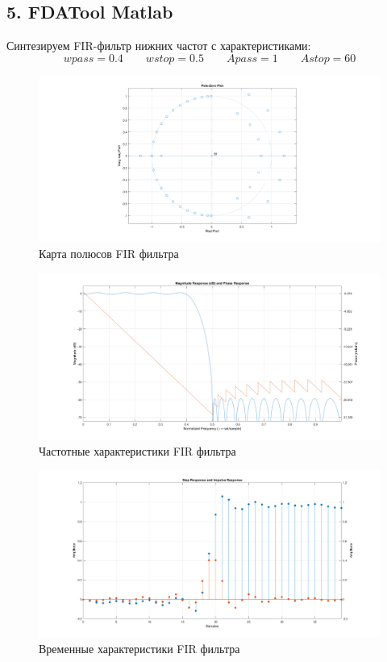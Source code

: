 \documentclass[12pt,a4paper]{article}
\begin{document}
	\subsection*{5. FDATool Matlab}
	
	Синтезируем FIR-фильтр нижних частот с характеристиками:
	$$ wpass = 0.4 \qquad wstop = 0.5 \qquad Apass = 1 \qquad Astop = 60$$
	
	\begin{figure}[H]
		\centering
		\includegraphics[width=1.0\linewidth]{res/5_fir_poles.png}
		\caption{Карта полюсов FIR фильтра}
	\end{figure}
	
	\begin{figure}[H]
		\centering
		\includegraphics[width=1.0\linewidth]{res/5_fir_ach.png}
		\caption{Частотные характеристики FIR фильтра}
	\end{figure}
		
	\begin{figure}[H]
		\centering
		\includegraphics[width=1.0\linewidth]{res/5_fir_time.png}
		\caption{Временные характеристики FIR фильтра}
	\end{figure}
	
\end{document}
